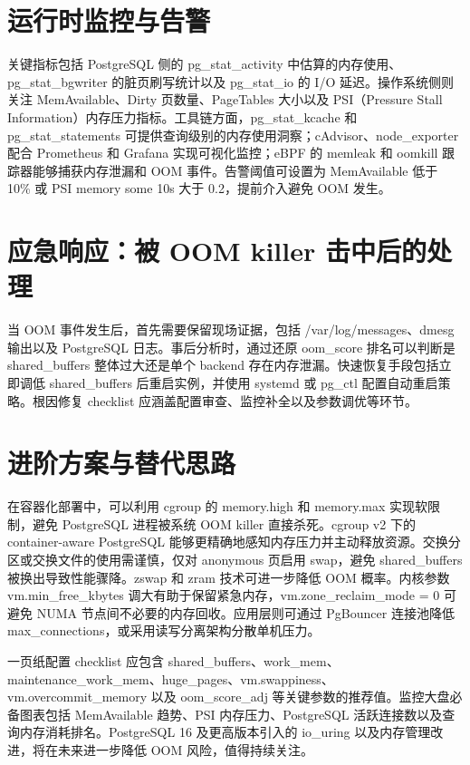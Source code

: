 \chapter{运行时监控与告警}
关键指标包括 PostgreSQL 侧的 pg\_{}stat\_{}activity 中估算的内存使用、pg\_{}stat\_{}bgwriter 的脏页刷写统计以及 pg\_{}stat\_{}io 的 I/O 延迟。操作系统侧则关注 MemAvailable、Dirty 页数量、PageTables 大小以及 PSI（Pressure Stall Information）内存压力指标。工具链方面，pg\_{}stat\_{}kcache 和 pg\_{}stat\_{}statements 可提供查询级别的内存使用洞察；cAdvisor、node\_{}exporter 配合 Prometheus 和 Grafana 实现可视化监控；eBPF 的 memleak 和 oomkill 跟踪器能够捕获内存泄漏和 OOM 事件。告警阈值可设置为 MemAvailable 低于 10\%{} 或 PSI memory some 10s 大于 0.2，提前介入避免 OOM 发生。\par
\chapter{应急响应：被 OOM killer 击中后的处理}
当 OOM 事件发生后，首先需要保留现场证据，包括 /var/log/messages、dmesg 输出以及 PostgreSQL 日志。事后分析时，通过还原 oom\_{}score 排名可以判断是 shared\_{}buffers 整体过大还是单个 backend 存在内存泄漏。快速恢复手段包括立即调低 shared\_{}buffers 后重启实例，并使用 systemd 或 pg\_{}ctl 配置自动重启策略。根因修复 checklist 应涵盖配置审查、监控补全以及参数调优等环节。\par
\chapter{进阶方案与替代思路}
在容器化部署中，可以利用 cgroup 的 memory.high 和 memory.max 实现软限制，避免 PostgreSQL 进程被系统 OOM killer 直接杀死。cgroup v2 下的 container-aware PostgreSQL 能够更精确地感知内存压力并主动释放资源。交换分区或交换文件的使用需谨慎，仅对 anonymous 页启用 swap，避免 shared\_{}buffers 被换出导致性能骤降。zswap 和 zram 技术可进一步降低 OOM 概率。内核参数 vm.min\_{}free\_{}kbytes 调大有助于保留紧急内存，vm.zone\_{}reclaim\_{}mode = 0 可避免 NUMA 节点间不必要的内存回收。应用层则可通过 PgBouncer 连接池降低 max\_{}connections，或采用读写分离架构分散单机压力。\par
一页纸配置 checklist 应包含 shared\_{}buffers、work\_{}mem、maintenance\_{}work\_{}mem、huge\_{}pages、vm.swappiness、vm.overcommit\_{}memory 以及 oom\_{}score\_{}adj 等关键参数的推荐值。监控大盘必备图表包括 MemAvailable 趋势、PSI 内存压力、PostgreSQL 活跃连接数以及查询内存消耗排名。PostgreSQL 16 及更高版本引入的 io\_{}uring 以及内存管理改进，将在未来进一步降低 OOM 风险，值得持续关注。\par
